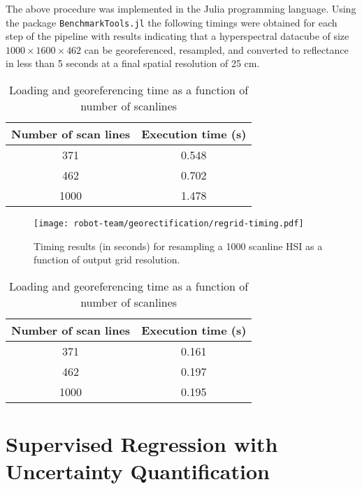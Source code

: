 The above procedure was implemented in the Julia programming language. Using the package \texttt{BenchmarkTools.jl} the following timings were obtained for each step of the pipeline with results indicating that a hyperspectral datacube of size $1000\times 1600\times 462$ can be georeferenced, resampled, and converted to reflectance in less than 5 seconds at a final spatial resolution of 25 cm.

\begin{table}[!hbt]
  \centering
  \begin{tabular}{ |c|c| }
    \hline
    \textbf{Number of scan lines}	& \textbf{Execution time (s)}\\
    \hline
    371		  &   0.548	\\
    462     &   0.702	\\
    1000    &   1.478  \\
    \hline
  \end{tabular}
  \caption{Loading and georeferencing time as a function of number of scanlines}
  \label{tab:georeference-times}
\end{table}

\begin{figure}[!hbt]
  \texttt{[image: robot-team/georectification/regrid-timing.pdf]}
  \caption{Timing results (in seconds) for resampling a 1000 scanline HSI as a function of output grid resolution.}
  \label{fig-regridding-timing}
\end{figure}

\begin{table}[h]
  \centering
  \begin{tabular}{ |c|c| }
    \hline
    \textbf{Number of scan lines}	& \textbf{Execution time (s)}\\
    \hline
    371		  &   0.161	\\
    462     &   0.197	\\
    1000    &   0.195  \\
    \hline
  \end{tabular}
  \caption{Loading and georeferencing time as a function of number of scanlines}
  \label{tab:reflectance-times}
\end{table}






\section{Supervised Regression with Uncertainty Quantification}

